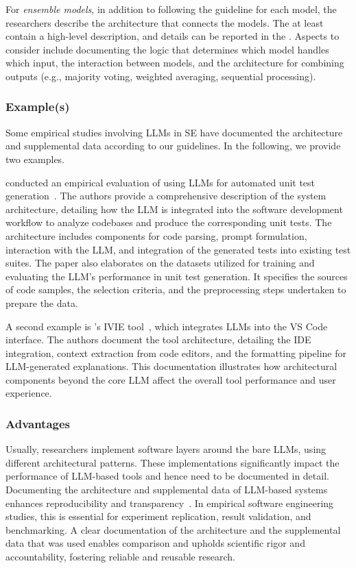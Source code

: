 For \emph{ensemble models}, in addition to following the \modelversion guideline for each model, the researchers \must describe the architecture that connects the models.
The \paper \must at least contain a high-level description, and details can be reported in the \supplementarymaterial.
Aspects to consider include documenting the logic that determines which model handles which input, the interaction between models, and the architecture for combining outputs (e.g., majority voting, weighted averaging, sequential processing).

\subsubsection{Example(s)}

Some empirical studies involving LLMs in SE have documented the architecture and supplemental data according to our guidelines. In the following, we provide two examples.

\citeauthor{DBLP:journals/tse/SchaferNET24} conducted an empirical evaluation of using LLMs for automated unit test generation~\cite{DBLP:journals/tse/SchaferNET24}.
The authors provide a comprehensive description of the system architecture, detailing how the LLM is integrated into the software development workflow to analyze codebases and produce the corresponding unit tests.
The architecture includes components for code parsing, prompt formulation, interaction with the LLM, and integration of the generated tests into existing test suites.
The paper also elaborates on the datasets utilized for training and evaluating the LLM's performance in unit test generation.
It specifies the sources of code samples, the selection criteria, and the preprocessing steps undertaken to prepare the data.

A second example is \citeauthor{DBLP:conf/chi/YanHWH24}'s IVIE tool~\cite{DBLP:conf/chi/YanHWH24}, which integrates LLMs into the VS Code interface.
The authors document the tool architecture, detailing the IDE integration, context extraction from code editors, and the formatting pipeline for LLM-generated explanations.
This documentation illustrates how architectural components beyond the core LLM affect the overall tool performance and user experience.

\subsubsection{Advantages}

Usually, researchers implement software layers around the bare LLMs, using different architectural patterns.
These implementations significantly impact the performance of LLM-based tools and hence need to be documented in detail.
Documenting the architecture and supplemental data of LLM-based systems enhances reproducibility and transparency~\cite{DBLP:journals/software/LuZXXW24}.
In empirical software engineering studies, this is essential for experiment replication, result validation, and benchmarking.
A clear documentation of the architecture and the supplemental data that was used enables comparison and upholds scientific rigor and accountability, fostering reliable and reusable research.

